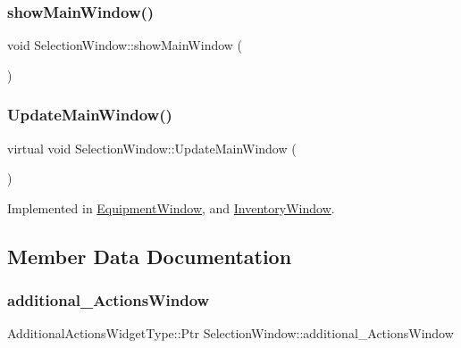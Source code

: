 \subsubsection{\texorpdfstring{show\+Main\+Window()}{showMainWindow()}}
{\footnotesize\ttfamily void Selection\+Window\+::show\+Main\+Window (\begin{DoxyParamCaption}{ }\end{DoxyParamCaption})}

\mbox{\label{class_selection_window_a4ccb50fc06840c6c3966c89b1d991b03}} 
\subsubsection{\texorpdfstring{Update\+Main\+Window()}{UpdateMainWindow()}}
{\footnotesize\ttfamily virtual void Selection\+Window\+::\+Update\+Main\+Window (\begin{DoxyParamCaption}{ }\end{DoxyParamCaption})\hspace{0.3cm}{\ttfamily [pure virtual]}}



Implemented in \mbox{\hyperlink{class_equipment_window_acf7d2c5609224291b20ad65d1241eeca}{Equipment\+Window}}, and \mbox{\hyperlink{class_inventory_window_a02cf6a3724a6ca38f12de98b96e8a8e7}{Inventory\+Window}}.



\subsection{Member Data Documentation}
\mbox{\label{class_selection_window_a7543c33777eaf4cb575db26d01e06799}} 
\subsubsection{\texorpdfstring{additional\+\_\+\+Actions\+Window}{additional\_ActionsWindow}}
{\footnotesize\ttfamily Additional\+Actions\+Widget\+Type\+::\+Ptr Selection\+Window\+::additional\+\_\+\+Actions\+Window\hspace{0.3cm}{\ttfamily [protected]}}

